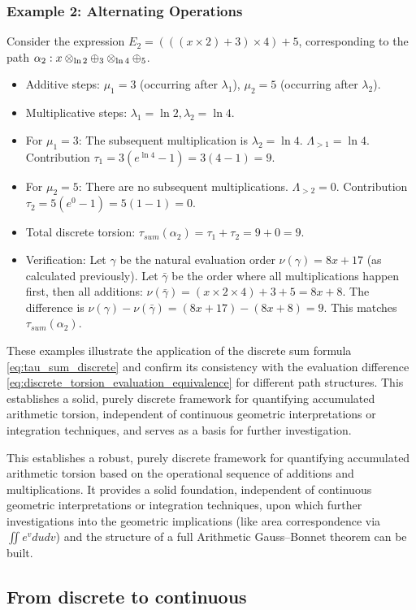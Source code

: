 \subsubsection*{Example 2: Alternating Operations}
Consider the expression $E_2 = (((x \times 2) + 3) \times 4) + 5$, corresponding to the path $\alpha_2: x \otimes_{\ln 2} \oplus_{3} \otimes_{\ln 4} \oplus_{5}$.
\begin{itemize}
    \item Additive steps: $\mu_1=3$ (occurring after $\lambda_1$), $\mu_2=5$ (occurring after $\lambda_2$).
    \item Multiplicative steps: $\lambda_1=\ln 2, \lambda_2=\ln 4$.
    \item For $\mu_1=3$: The subsequent multiplication is $\lambda_2=\ln 4$. $\Lambda_{>1} = \ln 4$. Contribution $\tau_1 = 3(e^{\ln 4}-1) = 3(4-1)=9$.
    \item For $\mu_2=5$: There are no subsequent multiplications. $\Lambda_{>2} = 0$. Contribution $\tau_2 = 5(e^{0}-1) = 5(1-1)=0$.
    \item Total discrete torsion: $\tau_{sum}(\alpha_2) = \tau_1 + \tau_2 = 9+0 = 9$.
    \item Verification: Let $\gamma$ be the natural evaluation order $\nu({\gamma}) = 8x+17$ (as calculated previously). Let $\bar{\gamma}$ be the order where all multiplications happen first, then all additions: $\nu({\bar{\gamma}}) = (x \times 2 \times 4) + 3 + 5 = 8x+8$. The difference is $\nu({\gamma}) - \nu({\bar{\gamma}}) = (8x+17) - (8x+8) = 9$. This matches $\tau_{sum}(\alpha_2)$.
\end{itemize}

These examples illustrate the application of the discrete sum formula \eqref{eq:tau_sum_discrete} and confirm its consistency with the evaluation difference \eqref{eq:discrete_torsion_evaluation_equivalence} for different path structures. This establishes a solid, purely discrete framework for quantifying accumulated arithmetic torsion, independent of continuous geometric interpretations or integration techniques, and serves as a basis for further investigation.

This establishes a robust, purely discrete framework for quantifying accumulated arithmetic torsion based on the operational sequence of additions and multiplications. It provides a solid foundation, independent of continuous geometric interpretations or integration techniques, upon which further investigations into the geometric implications (like area correspondence via $\iint e^v du dv$) and the structure of a full Arithmetic Gauss--Bonnet theorem can be built.


\subsection{From discrete to continuous}\label{subsec:discrete-to-continuous}



